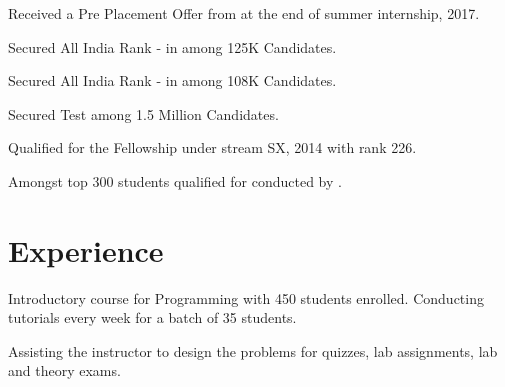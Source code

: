 \documentclass[a4paper]{norm-resume}
\begin{document}
\vspace{3mm} %

\begin{tightitemize}
    \item Received a Pre Placement Offer from {} at the end of summer internship, 2017.
    \item Secured All India Rank -  in {} among 125K Candidates.
    \item Secured All India Rank -  in {} among 108K Candidates.
    \item Secured  Test among 1.5 Million Candidates.
    \item Qualified for the  Fellowship under stream SX, 2014 with rank 226.
    \item Amongst top 300 students qualified for  conducted by .
\end{tightitemize}


\vspace{0mm}    %


\section{Experience \hrulefill}

\vspace{1mm} %
  
\begin{tightitemize}
        \small{
        \item Introductory course for Programming with 450 students enrolled. Conducting tutorials every week for a batch of 35 students.
        \item Assisting the instructor to design the problems for quizzes, lab assignments, lab and theory exams.
        }
\end{tightitemize}

\vspace{5mm}
\end{document}
